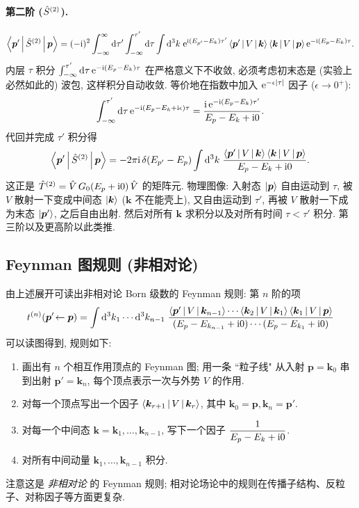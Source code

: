 \paragraph{第二阶 ($\hat{S}^{(2)}$).}
\begin{equation}
\left\langle \bm p' \,\middle|\, \hat{S}^{(2)} \,\middle|\, \bm p \right\rangle
=(-\mathrm{i})^{2}\int_{-\infty}^{\infty}\mathrm{d}\tau'\int_{-\infty}^{\tau'}\mathrm{d}\tau\int\mathrm{d}^{3}k\;
\mathrm{e}^{\mathrm{i}(E_{p'}-E_{k})\tau'}\left\langle \bm p' \,\middle|\, V \,\middle|\, \bm k \right\rangle\left\langle \bm k \,\middle|\, V \,\middle|\, \bm p \right\rangle\mathrm{e}^{-\mathrm{i}(E_{p}-E_{k})\tau}.
\end{equation}
内层 $\tau$ 积分 $\int_{-\infty}^{\tau'}\mathrm{d}\tau\,\mathrm{e}^{-\mathrm{i}(E_{p}-E_{k})\tau}$ 在严格意义下不收敛, 必须考虑初末态是 (实验上必然如此的) 波包, 这样积分自动收敛. 等价地在指数中加入 $\mathrm{e}^{-\epsilon|\tau|}$ 因子 ($\epsilon\to 0^{+}$):
\begin{equation}
\int_{-\infty}^{\tau'}\mathrm{d}\tau\,\mathrm{e}^{-\mathrm{i}(E_{p}-E_{k}+\mathrm{i}\epsilon)\tau}
=\frac{\mathrm{i}\,\mathrm{e}^{-\mathrm{i}(E_{p}-E_{k})\tau'}}{E_{p}-E_{k}+\mathrm{i} 0}.
\end{equation}
代回并完成 $\tau'$ 积分得
\begin{equation}
\left\langle \bm p' \,\middle|\, \hat{S}^{(2)} \,\middle|\, \bm p \right\rangle
=-2\pi\mathrm{i}\,\delta(E_{p'}-E_{p})\int\mathrm{d}^{3}k\;\frac{\left\langle \bm p' \,\middle|\, V \,\middle|\, \bm k \right\rangle\left\langle \bm k \,\middle|\, V \,\middle|\, \bm p \right\rangle}{E_{p}-E_{k}+\mathrm{i} 0}.
\end{equation}
这正是 $\hat{T}^{(2)}=\hat{V}\,G_{0}(E_{p}+\mathrm{i} 0)\,\hat{V}$ 的矩阵元. 物理图像: 入射态 $\ket{\bm p}$ 自由运动到 $\tau$, 被 $V$ 散射一下变成中间态 $\ket{\bm k}$ ($\bm k$ 不在能壳上), 又自由运动到 $\tau'$, 再被 $V$ 散射一下成为末态 $\ket{\bm p'}$, 之后自由出射. 然后对所有 $\bm k$ 求积分以及对所有时间 $\tau<\tau'$ 积分. 第三阶以及更高阶以此类推.

\subsection{Feynman 图规则 (非相对论)}

由上述展开可读出非相对论 Born 级数的 Feynman 规则: 第 $n$ 阶的项
\begin{equation}
t^{(n)}(\bm p'\!\leftarrow\bm p)
=\int\mathrm{d}^{3}k_{1}\cdots\mathrm{d}^{3}k_{n-1}\;
\frac{\left\langle \bm p' \,\middle|\, V \,\middle|\, \bm k_{n-1} \right\rangle\cdots\left\langle \bm k_{2} \,\middle|\, V \,\middle|\, \bm k_{1} \right\rangle\left\langle \bm k_{1} \,\middle|\, V \,\middle|\, \bm p \right\rangle}
{(E_{p}-E_{k_{n-1}}+\mathrm{i} 0)\cdots(E_{p}-E_{k_{1}}+\mathrm{i} 0)}
\end{equation}
可以读图得到, 规则如下:
\begin{enumerate}
  \item 画出有 $n$ 个相互作用顶点的 Feynman 图; 用一条 ``粒子线" 从入射 $\bm p=\bm k_{0}$ 串到出射 $\bm p'=\bm k_{n}$, 每个顶点表示一次与外势 $V$ 的作用.
  \item 对每一个顶点写出一个因子 $\left\langle \bm k_{r+1} \,\middle|\, V \,\middle|\, \bm k_{r} \right\rangle$, 其中 $\bm k_{0}=\bm p,\bm k_{n}=\bm p'$.
  \item 对每一个中间态 $\bm k=\bm k_{1},\ldots,\bm k_{n-1}$, 写下一个因子 $\dfrac{1}{E_{p}-E_{k}+\mathrm{i} 0}$.
  \item 对所有中间动量 $\bm k_{1},\ldots,\bm k_{n-1}$ 积分.
\end{enumerate}
注意这是 \emph{非相对论} 的 Feynman 规则; 相对论场论中的规则在传播子结构、反粒子、对称因子等方面更复杂.

